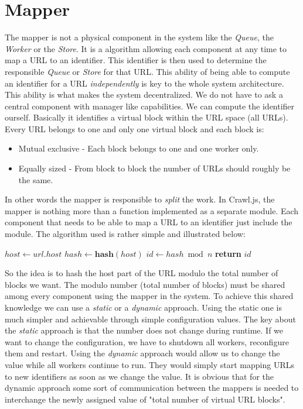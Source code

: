 \section{Mapper}
\label{mapper}
The mapper is not a physical component in the system like the \emph{Queue}, the \emph{Worker} or the \emph{Store}. It is a algorithm allowing each component at any time to map a URL to an identifier. This identifier is then used to determine the responsible \emph{Queue} or \emph{Store} for that URL.
This ability of being able to compute an identifier for a URL \emph{independently} is key to the whole system architecture. This ability is what makes the system decentralized. We do not have to ask a central component with manager like capabilities. We can compute the identifier ourself. Basically it identifies a virtual block within the URL space (all URLs). Every URL belongs to one and only one virtual block and each block is:
\begin{itemize}
  \item Mutual exclusive - Each block belongs to one and one worker only.
  \item Equally sized - From block to block the number of URLs should roughly be the same.
\end{itemize}

In other words the mapper is responsible to \emph{split} the work. In Crawl.js, the mapper is nothing more than a function implemented as a separate module. Each component that needs to be able to map a URL to an identifier just include the module. The algorithm used is rather simple and illustrated below:
\begin{algorithmic}[0]
\State $host \gets url.host$
\State $hash \gets \textbf{hash}(host)$
\State $id \gets hash \bmod n$
\State \textbf{return} $id$
\EndFunction
\end{algorithmic}

So the idea is to hash the host part of the URL modulo the total number of blocks we want. The modulo number (total number of blocks) must be shared among every component using the mapper in the system.
To achieve this shared knowledge we can use a \emph{static} or a \emph{dynamic} approach. Using the static one is much simpler and achievable through simple configuration values. The key about the \emph{static} approach is that the number does not change during runtime. If we want to change the configuration, we have to shutdown all workers, reconfigure them and restart. Using the \emph{dynamic} approach would allow us to change the value while all workers continue to run. They would simply start mapping URLs to new identifiers as soon as we change the value. It is obvious that for the dynamic approach some sort of communication between the mappers is needed to interchange the newly assigned value of "total number of virtual URL blocks".

